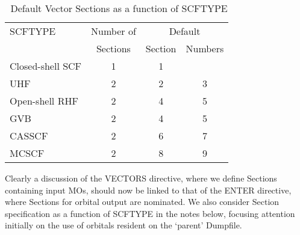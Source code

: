 \documentclass[11pt,fleqn]{article}
\begin{document}
\begin{table}
 \caption{\label{table:2}\  Default Vector Sections as a function of SCFTYPE}
 
 \begin{centering}
 \begin{tabular}{lccc}
\\ \hline\hline
  SCFTYPE               & Number of &   \multicolumn{2}{c}{Default}  \\
           \cline{3-4}
                        & Sections  &   Section & Numbers \\ \cline{1-4}
 
  Closed-shell SCF      &      1   &    1 &   \\
  UHF                   &      2   &    2 & 3 \\
  Open-shell RHF        &      2   &    4 & 5 \\
  GVB                   &      2   &    4 & 5 \\
  CASSCF                &      2   &    6 & 7 \\
  MCSCF                 &      2   &    8 & 9 \\
\hline\hline
 \end{tabular}
 
 \end{centering}
\end{table}

Clearly a discussion of the VECTORS directive, where we define Sections
containing input MOs, should now be linked to that of the ENTER directive,
where Sections for orbital output are nominated. We also consider
Section specification as a function of SCFTYPE in the notes below,
focusing attention initially on the use of orbitals resident on the
`parent' Dumpfile.
\end{document}
